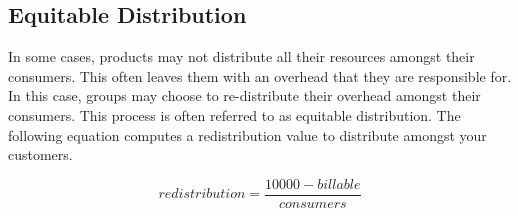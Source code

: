 \documentclass[10pt, a4paper, twocolumn]{article}
\begin{document}
  \subsection*{Equitable Distribution}
    In some cases, products may not distribute all their resources amongst their consumers.
    This often leaves them with an overhead that they are responsible for.
    In this case, groups may choose to re-distribute their overhead amongst their consumers.
    This process is often referred to as equitable distribution.
    The following equation computes a redistribution value to distribute amongst your customers.

    \[ redistribution = \frac{10000 - billable}{consumers} \]

\printbibliography
\end{document}
